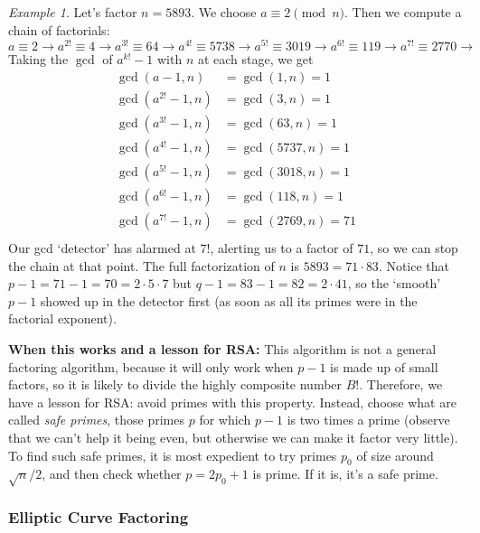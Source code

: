 \documentclass{article}
\theoremstyle{plain}
\theoremstyle{definition}
\theoremstyle{remark}
\newtheorem{example}[theorem]{Example}
\numberwithin{theorem}{section}
\begin{document}
\begin{example}
    Let's factor $n = 5893$.  We choose $a \equiv 2 \pmod{n}$.  Then we compute a chain of factorials:
    \[
    a\equiv 2 \rightarrow
    a^{2!} \equiv 4 \rightarrow
     a^{3!} \equiv 64 \rightarrow
      a^{4!} \equiv 5738 \rightarrow
       a^{5!} \equiv 3019 \rightarrow
        a^{6!} \equiv 119 \rightarrow
        a^{7!} \equiv 2770 \rightarrow
    \]
    Taking the $\gcd$ of $a^{k!} -1$ with $n$ at each stage, we get
    \begin{align*}
    \gcd(a-1,n) &= \gcd(1,n) = 1 \\
    \gcd(a^{2!}-1,n) &= \gcd(3,n) = 1 \\
    \gcd(a^{3!}-1,n) &= \gcd(63,n) = 1 \\
    \gcd(a^{4!}-1,n) &= \gcd(5737,n) = 1 \\
    \gcd(a^{5!}-1,n) &= \gcd(3018,n) = 1 \\
    \gcd(a^{6!}-1,n) &= \gcd(118,n) = 1 \\
    \gcd(a^{7!}-1,n) &= \gcd(2769, n) = 71 \\
    \end{align*}
    Our gcd `detector' has alarmed at $7!$, alerting us to a factor of $71$, so we can stop the chain at that point.  The full factorization of $n$ is $5893 = 71 \cdot 83$.  Notice that $p-1 = 71-1 = 70 = 2 \cdot 5 \cdot 7$ but $q-1 = 83 - 1 = 82 = 2 \cdot 41$, so the `smooth' $p-1$ showed up in the detector first (as soon as all its primes were in the factorial exponent).
\end{example}



\textbf{When this works and a lesson for RSA:}
This algorithm is not a general factoring algorithm, because it will only work when $p-1$ is made up of small factors, so it is likely to divide the highly composite number $B!$.  Therefore, we have a lesson for RSA:  avoid primes with this property.  Instead, choose what are called \emph{safe primes}, those primes $p$ for which $p-1$ is two times a prime (observe that we can't help it being even, but otherwise we can make it factor very little).  To find such safe primes, it is most expedient to try primes $p_0$ of size around $\sqrt{n}/2$, and then check whether $p = 2p_0+1$ is prime.  If it is, it's a safe prime.


\subsubsection{Elliptic Curve Factoring}
\end{document}
